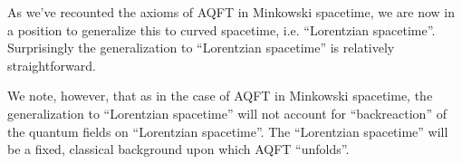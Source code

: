 As we've recounted the axioms of AQFT in Minkowski spacetime, we are now in a position to generalize this to curved spacetime, i.e. ``Lorentzian spacetime''. Surprisingly the generalization to ``Lorentzian spacetime'' is relatively straightforward.
    
We note, however, that as in the case of AQFT in Minkowski spacetime, the generalization to ``Lorentzian spacetime'' will not account for ``backreaction'' of the quantum fields on ``Lorentzian spacetime''. The ``Lorentzian spacetime'' will be a fixed, classical background upon which AQFT ``unfolds''.
